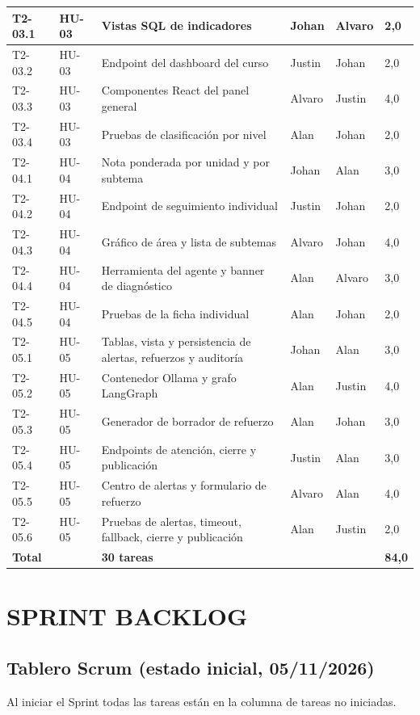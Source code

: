 \documentclass[11pt,a4paper]{article}
\begin{document}
\begin{longtable}{|R{1.5cm}|R{1.3cm}|R{5.0cm}|R{1.9cm}|R{1.9cm}|R{1.5cm}|}
T2-03.1 & HU-03 & Vistas SQL de indicadores & Johan & Alvaro & 2,0\\ \hline
T2-03.2 & HU-03 & Endpoint del dashboard del curso & Justin & Johan & 2,0\\ \hline
T2-03.3 & HU-03 & Componentes React del panel general & Alvaro & Justin & 4,0\\ \hline
T2-03.4 & HU-03 & Pruebas de clasificación por nivel & Alan & Johan & 2,0\\ \hline
T2-04.1 & HU-04 & Nota ponderada por unidad y por subtema & Johan & Alan & 3,0\\ \hline
T2-04.2 & HU-04 & Endpoint de seguimiento individual & Justin & Johan & 2,0\\ \hline
T2-04.3 & HU-04 & Gráfico de área y lista de subtemas & Alvaro & Johan & 4,0\\ \hline
T2-04.4 & HU-04 & Herramienta del agente y banner de diagnóstico & Alan & Alvaro & 3,0\\ \hline
T2-04.5 & HU-04 & Pruebas de la ficha individual & Alan & Johan & 2,0\\ \hline
T2-05.1 & HU-05 & Tablas, vista y persistencia de alertas, refuerzos y auditoría & Johan & Alan & 3,0\\ \hline
T2-05.2 & HU-05 & Contenedor Ollama y grafo LangGraph & Alan & Justin & 4,0\\ \hline
T2-05.3 & HU-05 & Generador de borrador de refuerzo & Alan & Johan & 3,0\\ \hline
T2-05.4 & HU-05 & Endpoints de atención, cierre y publicación & Justin & Alan & 3,0\\ \hline
T2-05.5 & HU-05 & Centro de alertas y formulario de refuerzo & Alvaro & Alan & 4,0\\ \hline
T2-05.6 & HU-05 & Pruebas de alertas, timeout, fallback, cierre y publicación & Alan & Justin & 2,0\\ \hline
\textbf{Total} & & \textbf{30 tareas} & & & \textbf{84,0}\\ \hline
\end{longtable}

\section{SPRINT BACKLOG}

\subsection{Tablero Scrum (estado inicial, 05/11/2026)}
Al iniciar el Sprint todas las tareas están en la columna de tareas no iniciadas.
\end{document}
